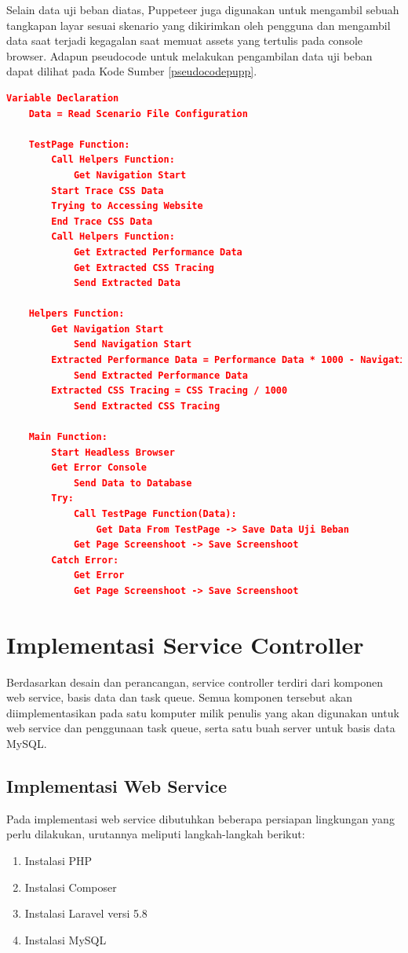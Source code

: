 	 	\indent Selain data uji beban diatas, Puppeteer juga digunakan untuk mengambil sebuah tangkapan layar sesuai skenario yang dikirimkan oleh pengguna dan mengambil data saat terjadi kegagalan saat memuat assets yang tertulis pada console browser. Adapun pseudocode untuk melakukan pengambilan data uji beban dapat dilihat pada Kode Sumber \ref{pseudocodepupp}.
	 	
	 	\begin{lstlisting}[frame=single,tabsize=2,breaklines,caption={Pseudocode Puppeteer },label=pseudocodepupp, captionpos=b, language=json]
 	Variable Declaration
 	Data = Read Scenario File Configuration
 	
 	TestPage Function:
 		Call Helpers Function:
 			Get Navigation Start
 		Start Trace CSS Data
 		Trying to Accessing Website
 		End Trace CSS Data
 		Call Helpers Function:
 			Get Extracted Performance Data
 			Get Extracted CSS Tracing
 			Send Extracted Data
 	
 	Helpers Function:
 		Get Navigation Start
 			Send Navigation Start
 		Extracted Performance Data = Performance Data * 1000 - Navigation Start
 			Send Extracted Performance Data
 		Extracted CSS Tracing = CSS Tracing / 1000
 			Send Extracted CSS Tracing 
 	
 	Main Function:
 		Start Headless Browser
 		Get Error Console
 			Send Data to Database
 		Try:
 			Call TestPage Function(Data):
 				Get Data From TestPage -> Save Data Uji Beban
 			Get Page Screenshoot -> Save Screenshoot
 		Catch Error:
 			Get Error
 			Get Page Screenshoot -> Save Screenshoot
	 	\end{lstlisting}
	
	\section{Implementasi Service Controller}
		Berdasarkan desain dan perancangan, service controller terdiri dari komponen web service, basis data dan task queue. Semua komponen tersebut akan diimplementasikan pada satu komputer milik penulis yang akan digunakan untuk web service dan penggunaan task queue, serta satu buah server untuk basis data MySQL.
		
		\subsection{Implementasi Web Service}
			Pada implementasi web service dibutuhkan beberapa persiapan lingkungan yang perlu dilakukan, urutannya meliputi langkah-langkah berikut:
			\begin{enumerate}
				\item Instalasi PHP
				\item Instalasi Composer
				\item Instalasi Laravel versi 5.8
				\item Instalasi MySQL
			\end{enumerate}
		
